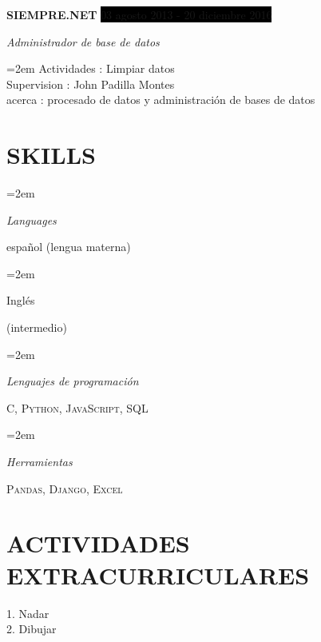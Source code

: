 \documentclass[paper=a4,fontsize=11pt]{scrartcl} %
\newlength{\spacebox}
\newcommand{\sepspace}{\vspace*{1em}}		%
\newcommand{\NewPart}[1]{\section*{\uppercase{#1}}}
\newcommand{\PersonalEntry}[2]{
		\noindent\hangindent=2em\hangafter=0 %
		\parbox{\spacebox}{        %
		\textit{#1}}		       %
		\hspace{1.5em} #2 \par}    %
\newcommand{\SkillsEntry}[2]{      %
		\noindent\hangindent=2em\hangafter=0 %
		\parbox{\spacebox}{        %
		\textit{#1}}			   %
		\hspace{1.5em} #2 \par}    %
\newcommand{\EducationEntry}[4]{
		\noindent \textbf{#1} \hfill      %
		\colorbox{Black}{%
			\parbox{6em}{%
			\hfill\color{White}#2}} \par  %
		\noindent \textit{#3} \par        %
		\noindent\hangindent=2em\hangafter=0 \small #4 %
		\normalsize \par}
\newcommand{\WorkEntry}[4]{				  %
		\noindent \textbf{#1} \hfill      %
		\colorbox{Black}{\color{White}#2} \par  %
		\noindent \textit{#3} \par              %
		\noindent\hangindent=2em\hangafter=0 \small #4 %
		\normalsize \par}
\begin{document}
\WorkEntry{SIEMPRE.NET}{03 agosto 2013 - 20 diciembre 2016}{Administrador de base de datos}{Actividades : Limpiar datos\\Supervision : John Padilla Montes\\acerca : procesado de datos y administración de bases de datos}


\NewPart{Skills}{}

\SkillsEntry{Languages}{español (lengua materna)}
\SkillsEntry{}{Inglés}{(intermedio)}
\sepspace

\SkillsEntry{Lenguajes de programación}{\textsc{C}, \textsc{Python},  \textsc{JavaScript}, \textsc{SQL}}
\sepspace

\SkillsEntry{Herramientas}{\textsc{Pandas}, \textsc{Django}, \textsc{Excel}}
\sepspace


\NewPart{actividades extracurriculares}{}
1. Nadar
\\
\sepspace
2. Dibujar
\end{document}
